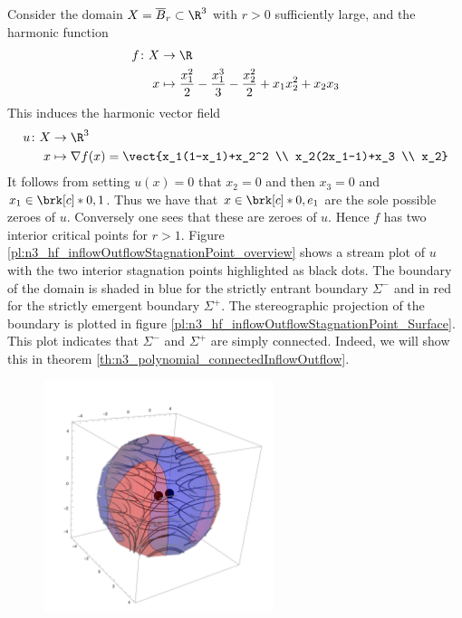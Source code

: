 \begin{example}
  \label{ex:n3_polynomial_defn}
  Consider the domain $X=\overline{B}_r\subset\R^3$ with $r>0$ sufficiently large, and the harmonic function
  \begin{align}
    \begin{aligned}
    f\colon X&\to\R \\
    x&\mapsto \frac{x_1^2}{2}-\frac{x_1^3}{3}-\frac{x_2^2}{2}+x_1x_2^2+x_2x_3
    \end{aligned}
    \label{eq:n3_polynomial_defnf}
  \end{align}
  This induces the harmonic vector field
  \begin{align*}
    u\colon X&\to\R^3 \\
    x&\mapsto\nabla f(x)=\vect{x_1(1-x_1)+x_2^2 \\
      x_2(2x_1-1)+x_3 \\
      x_2}
  \end{align*}
  It follows from setting $u(x)=0$ that $x_2=0$
  and then $x_3=0$ and $x_1\in\brk[c]*{0,1}$. Thus we have that $x\in\brk[c]*{0,e_1}$
  are the sole possible zeroes of $u$. Conversely one sees that these are zeroes of $u$.
  Hence $f$ has two interior critical points for $r>1$.
  Figure \ref{pl:n3_hf_inflowOutflowStagnationPoint_overview}
  shows a stream plot of $u$ with the two interior stagnation points highlighted as black dots.
  The boundary of the domain is shaded in blue for the strictly entrant boundary $\Sigma^-$ and in red 
  for the strictly emergent boundary $\Sigma^+$.
  The stereographic projection of the boundary is plotted in figure \ref{pl:n3_hf_inflowOutflowStagnationPoint_Surface}.
  This plot indicates that $\Sigma^-$ and $\Sigma^+$ are simply connected.
  Indeed, we will show this in theorem \ref{th:n3_polynomial_connectedInflowOutflow}.
  \begin{figure}
    \centering
    \includegraphics[width=0.6\textwidth]{../plots/n3_hf_inflowOutflow_Ball_overview.pdf}

\end{figure}
\end{example}
